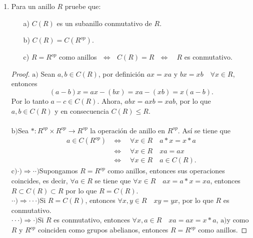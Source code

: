 \documentclass{article}
\theoremstyle{definition}
\theoremstyle{plain}
\theoremstyle{plain}
\theoremstyle{definition}
\theoremstyle{definition}
\theoremstyle{definition}
\theoremstyle{definition}
\theoremstyle{definition}
\theoremstyle{definition}
\begin{document}
\begin{enumerate}[label=\textbf{Ej \arabic*.}]
    \item
    Para un anillo $R$ pruebe que: 
\begin{itemize}
\item[a)] $C(R)$ es un subanillo conmutativo de $R$.
\item[b)] $C(R)=C(R^{op})$.
\item[c)] $R=R^{op}$ como anillos\,\, $\Leftrightarrow$ \,\,$C(R)=R$\,\, $\Leftrightarrow$ \,\, $R$ es conmutativo.
\end{itemize}

\begin{proof}
$\boxed{\text{a)}}$ \quad Sean $a,b\in C(R)$, por definición $ax=xa$ y $bx=xb\quad\forall x\in R$, entonces
\[(a-b)x=ax-(bx)=xa-(xb)=x(a-b).\]
Por lo tanto $a-c\in C(R)$. Ahora, $abx=axb=xab$, por lo que $a,b\in C(R)$ y en consecuencia $C(R)\leq R$.\\\\
$\boxed{\text{b)}}$\quad Sea $*:R^{op}\times R^{op}\to R^{op}$ la operación de anillo en $R^{op}$. Así se tiene que 
\begin{align*}
a\in C(R^{op})
&\Leftrightarrow\quad  \forall x\in R\quad a*x=x*a \\
& \Leftrightarrow\quad \forall x\in R\quad xa=ax\\
&\Leftrightarrow\quad \forall x\in R\quad a\in C(R).
\end{align*}
$\boxed{\text{c)}}$\quad $\boxed{\cdot)\Rightarrow \cdot\cdot)}$\quad Supongamos $R=R^{op}$ como anillos, 
entonces sus operaciones coincides, es decir,
$\forall a\in R$ se tiene que $\forall x\in R\quad ax=a*x=xa$, entonces $R\subset C(R)\subset R$ por lo que $R=C(R)$.\\
 
$\boxed{\cdot\cdot)\Rightarrow \cdot\cdot\cdot)}$\quad Si $R=C(R)$, entonces $\forall x,y\in R\quad xy=yx$, por lo que
 $R$ es conmutativo.\\
  
$\boxed{\cdot\cdot\cdot)\Rightarrow \cdot)}$\quad Si $R$ es conmutativo, entonces $\forall x,a\in R\quad xa=ax=x*a$, 
$\boxed{\text{a)}}$y como $R$ y $R^{op}$ 
coinciden como grupos abelianos, entonces $R=R^{op}$ como anillos.
\end{proof}


\end{enumerate}
\end{document}
